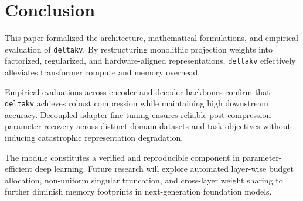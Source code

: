 \section{Conclusion}
This paper formalized the architecture, mathematical formulations, and empirical evaluation of \texttt{deltakv}. By restructuring monolithic projection weights into factorized, regularized, and hardware-aligned representations, \texttt{deltakv} effectively alleviates transformer compute and memory overhead.

Empirical evaluations across encoder and decoder backbones confirm that \texttt{deltakv} achieves robust compression while maintaining high downstream accuracy. Decoupled adapter fine-tuning ensures reliable post-compression parameter recovery across distinct domain datasets and task objectives without inducing catastrophic representation degradation.

The module constitutes a verified and reproducible component in parameter-efficient deep learning. Future research will explore automated layer-wise budget allocation, non-uniform singular truncation, and cross-layer weight sharing to further diminish memory footprints in next-generation foundation models.
